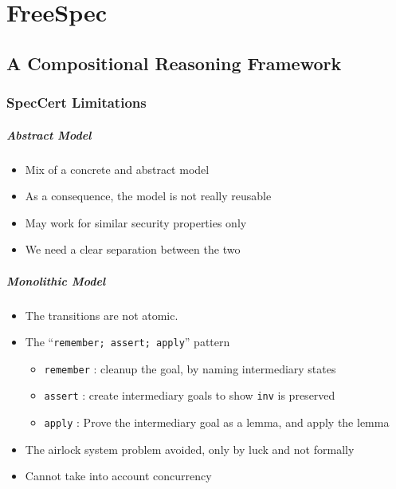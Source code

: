 \documentclass[oneside,a4paper]{memoir}
\theoremstyle{break}
\begin{document}
\chapter{FreeSpec}

\section{A Compositional Reasoning Framework}

\subsection{SpecCert Limitations}

\paragraph{Abstract Model}
%
\begin{itemize}
\item Mix of a concrete and abstract model
\item As a consequence, the model is not really reusable
\item May work for similar security properties only
\item We need a clear separation between the two
\end{itemize}

\paragraph{Monolithic Model}
%
\begin{itemize}
\item The transitions are not atomic.
\item The ``\texttt{remember; assert; apply}'' pattern
  \begin{itemize}
  \item \texttt{remember} : cleanup the goal, by naming intermediary states
  \item \texttt{assert} : create intermediary goals to show \texttt{inv} is
    preserved
  \item \texttt{apply} : Prove the intermediary goal as a lemma, and apply the
    lemma
  \end{itemize}
\item The airlock system problem avoided, only by luck and not formally
\item Cannot take into account concurrency
\end{itemize}
\end{document}
